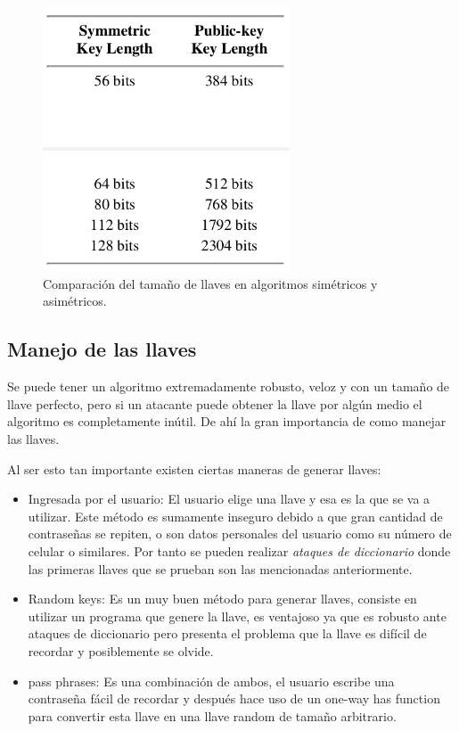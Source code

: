\begin{figure}
	\centering
	\includegraphics[width=0.65\textwidth]{./images/figVariacionLlaves}
	\caption{Comparación del tamaño de llaves en algoritmos simétricos y asimétricos.}
	\label{figVariacionLlaves}
\end{figure}

\subsection{Manejo de las llaves}
Se puede tener un algoritmo extremadamente robusto, veloz y con un tamaño de llave perfecto, pero si un atacante puede obtener la llave por algún medio el algoritmo es completamente inútil. De ahí la gran importancia de como manejar las llaves.

Al ser esto tan importante existen ciertas maneras de generar llaves:
\begin{itemize}
\item Ingresada por el usuario: El usuario elige una llave y esa es la que se va a utilizar. Este método es sumamente inseguro
debido a que gran cantidad de contraseñas se repiten, o son datos personales del usuario como su número de celular o similares.
Por tanto se pueden realizar \textit{ataques de diccionario} donde las primeras llaves que se prueban son las mencionadas
anteriormente.

\item Random keys: Es un muy buen método para generar llaves, consiste en utilizar un programa que genere la llave, es ventajoso
ya que es robusto ante ataques de diccionario pero presenta el problema que la llave es difícil de recordar y posiblemente se olvide.

\item pass phrases: Es una combinación de ambos, el usuario escribe una contraseña fácil de recordar y después
hace uso de un one-way has function para convertir esta llave en una llave random de tamaño arbitrario.
\end{itemize}





